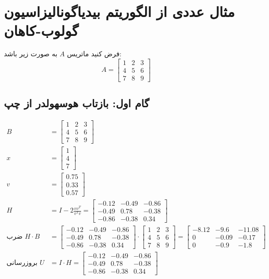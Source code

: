 \section{مثال عددی از الگوریتم بیدیاگونالیزاسیون گولوب-کاهان}

فرض کنید ماتریس \( A \) به صورت زیر باشد:
\[
A = \begin{bmatrix}
1 & 2 & 3 \\
4 & 5 & 6 \\
7 & 8 & 9
\end{bmatrix}
\]

\subsection*{گام اول: بازتاب هوسهولدر از چپ }
\begin{align*}
B &= \begin{bmatrix}
1 & 2 & 3 \\
4 & 5 & 6 \\
7 & 8 & 9
\end{bmatrix} \\
x &= \begin{bmatrix}
1 \\
4 \\
7
\end{bmatrix} \\
v &= \begin{bmatrix}
0.75 \\
0.33 \\
0.57
\end{bmatrix} \\
H &= I - 2 \frac{vv^T}{v^T v} = \begin{bmatrix}
-0.12 & -0.49 & -0.86 \\
-0.49 &  0.78 & -0.38 \\
-0.86 & -0.38 &  0.34
\end{bmatrix} \\
\text{ضرب } H \cdot B &= \begin{bmatrix}
-0.12 & -0.49 & -0.86 \\
-0.49 &  0.78 & -0.38 \\
-0.86 & -0.38 &  0.34
\end{bmatrix} \cdot \begin{bmatrix}
1 & 2 & 3 \\
4 & 5 & 6 \\
7 & 8 & 9
\end{bmatrix} = \begin{bmatrix}
 -8.12 &  -9.6 &  -11.08 \\
  0 &  -0.09 &  -0.17 \\
  0 &  -0.9 &  -1.8
\end{bmatrix} \\
\text{بروزرسانی } U &= I \cdot H = \begin{bmatrix}
-0.12 & -0.49 & -0.86 \\
-0.49 &  0.78 & -0.38 \\
-0.86 & -0.38 &  0.34
\end{bmatrix}
\end{align*}

